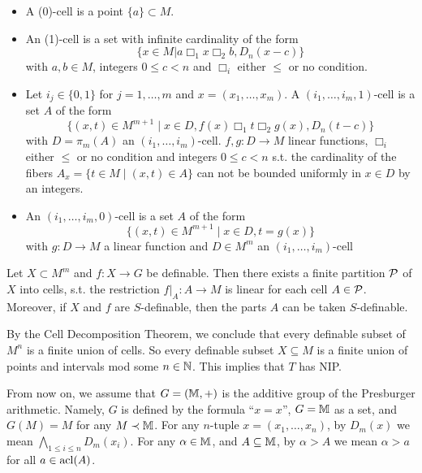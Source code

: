\documentclass[11pt]{article}
\begin{document}
\begin{definition}[]
\begin{itemize}
\item A (0)-cell is a point \(\{a\}\subset M\).
\item An (1)-cell is a set with infinite cardinality of the form
\begin{equation*}
\{x\in M|a\Box_1x\Box_2b,D_n(x-c)\}
\end{equation*}
with \(a,b\in M\), integers \(0\le c<n\) and \(\Box_i\) either \(\le\) or no condition.
\item Let \(i_j\in\{0,1\}\) for \(j=1,\dots,m\) and \(x=(x_1,\dots,x_m)\). A \((i_1,\dots,i_m,1)\)-cell is a set \(A\)
of the form
\begin{equation*}
\{(x,t)\in M^{m+1}\mid x\in D,f(x)\Box_1t\Box_2g(x), D_n(t-c)\}
\end{equation*}
with \(D=\pi_m(A)\) an \((i_1,\dots,i_m)\)-cell. \(f,g:D\to M\) linear functions, \(\Box_i\) either \(\le\)
or no condition and integers \(0\le c<n\) s.t. the cardinality of the
fibers \(A_x=\{t\in M\mid (x,t)\in A\}\) can not be bounded uniformly in \(x\in D\) by an integers.
\item An \((i_1,\dots,i_m,0)\)-cell is a set \(A\) of the form
\begin{equation*}
\{(x,t)\in M^{m+1}\mid x\in D,t=g(x)\}
\end{equation*}
with \(g:D\to M\) a linear function and \(D\in M^m\) an \((i_1,\dots,i_m)\)-cell
\end{itemize}
\end{definition}

\begin{fact}
\label{1.8}
Let \(X\subset M^m\) and \(f:X\to G\) be definable. Then there exists a finite partition \(\mathcal{P}\) of \(X\)
into cells, s.t. the restriction \(f|_A:A\to M\) is linear for each cell \(A\in\mathcal{P}\). Moreover,
if \(X\) and \(f\) are \(S\)-definable, then the parts \(A\) can be taken \(S\)-definable.
\end{fact}

By the Cell Decomposition Theorem, we conclude that every definable subset of \(M^n\) is a finite
union of cells. So every definable subset \(X\subseteq M\) is a finite union of points and intervals mod
some \(n\in\mathbb{N}\). This implies that \(T\) has NIP. \label{Problem2}

From now on, we assume that \(G=(\mathbb{M},+)\) is the additive group of the Presburger arithmetic.
Namely, \(G\) is defined by the formula ``\(x=x\)'', \(G=\mathbb{M}\) as a set, and \(G(M)=M\) for
any \(M\prec\mathbb{M}\). For any \(n\)-tuple \(x=(x_1,\dots,x_n)\), by \(D_m(x)\) we mean \(\bigwedge_{1\le i\le n}D_m(x_i)\).
For any \(\alpha\in\mathbb{M}\), and \(A\subseteq\mathbb{M}\), by \(\alpha>A\) we mean \(\alpha>a\) for all \(a\in\operatorname{acl}(A)\).
\end{document}

